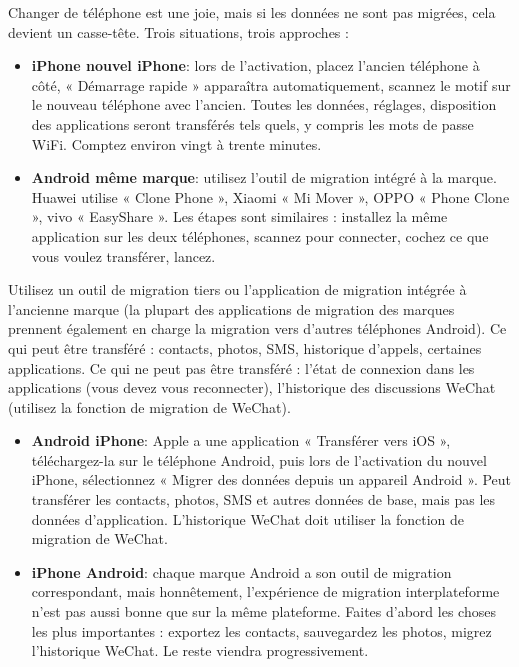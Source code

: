 
Changer de téléphone est une joie, mais si les données ne sont pas migrées, cela devient un casse-tête. Trois situations, trois approches :


\begin{itemize}
  \item \textbf{iPhone nouvel iPhone}: lors de l'activation, placez l'ancien téléphone à côté, « Démarrage rapide » apparaîtra automatiquement, scannez le motif sur le nouveau téléphone avec l'ancien. Toutes les données, réglages, disposition des applications seront transférés tels quels, y compris les mots de passe WiFi. Comptez environ vingt à trente minutes.
  \item \textbf{Android même marque}: utilisez l'outil de migration intégré à la marque. Huawei utilise « Clone Phone », Xiaomi « Mi Mover », OPPO « Phone Clone », vivo « EasyShare ». Les étapes sont similaires : installez la même application sur les deux téléphones, scannez pour connecter, cochez ce que vous voulez transférer, lancez.
\end{itemize}


Utilisez un outil de migration tiers ou l'application de migration intégrée à l'ancienne marque (la plupart des applications de migration des marques prennent également en charge la migration vers d'autres téléphones Android). Ce qui peut être transféré : contacts, photos, SMS, historique d'appels, certaines applications. Ce qui ne peut pas être transféré : l'état de connexion dans les applications (vous devez vous reconnecter), l'historique des discussions WeChat (utilisez la fonction de migration de WeChat).


\begin{itemize}
  \item \textbf{Android iPhone}: Apple a une application « Transférer vers iOS », téléchargez-la sur le téléphone Android, puis lors de l'activation du nouvel iPhone, sélectionnez « Migrer des données depuis un appareil Android ». Peut transférer les contacts, photos, SMS et autres données de base, mais pas les données d'application. L'historique WeChat doit utiliser la fonction de migration de WeChat.
  \item \textbf{iPhone Android}: chaque marque Android a son outil de migration correspondant, mais honnêtement, l'expérience de migration interplateforme n'est pas aussi bonne que sur la même plateforme. Faites d'abord les choses les plus importantes : exportez les contacts, sauvegardez les photos, migrez l'historique WeChat. Le reste viendra progressivement.
\end{itemize}

